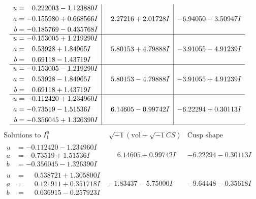 \documentclass[1p]{elsarticle_modified}
\theoremstyle{definition}
\newcommand{\I}{\sqrt{-1}}
\begin{document}
$$\begin{array}{c|c|c}
\begin{aligned}
u &= \phantom{-}0.222003 - 1.123880 I \\
a &= -0.155980 + 0.668566 I \\
b &= -0.185769 - 0.435768 I\end{aligned}
 & \phantom{-}2.27216 + 2.01728 I & -6.94050 - 3.50947 I \\ \hline\begin{aligned}
u &= -0.153005 + 1.219290 I \\
a &= \phantom{-}0.53928 + 1.84965 I \\
b &= \phantom{-}0.69118 - 1.43719 I\end{aligned}
 & \phantom{-}5.80153 + 4.79888 I & -3.91055 - 4.91239 I \\ \hline\begin{aligned}
u &= -0.153005 - 1.219290 I \\
a &= \phantom{-}0.53928 - 1.84965 I \\
b &= \phantom{-}0.69118 + 1.43719 I\end{aligned}
 & \phantom{-}5.80153 - 4.79888 I & -3.91055 + 4.91239 I \\ \hline\begin{aligned}
u &= -0.112420 + 1.234960 I \\
a &= -0.73519 - 1.51536 I \\
b &= -0.356045 + 1.326390 I\end{aligned}
 & \phantom{-}6.14605 - 0.99742 I & -6.22294 + 0.30113 I\\
 \hline 
 \end{array}$$\newpage$$\begin{array}{c|c|c}  
\text{Solutions to }I^u_{1}& \I (\text{vol} + \sqrt{-1}CS) & \text{Cusp shape}\\
 \hline 
\begin{aligned}
u &= -0.112420 - 1.234960 I \\
a &= -0.73519 + 1.51536 I \\
b &= -0.356045 - 1.326390 I\end{aligned}
 & \phantom{-}6.14605 + 0.99742 I & -6.22294 - 0.30113 I \\ \hline\begin{aligned}
u &= \phantom{-}0.538721 + 1.305800 I \\
a &= \phantom{-}0.121911 + 0.351718 I \\
b &= \phantom{-}0.036915 - 0.257923 I\end{aligned}
 & -1.83437 - 5.75000 I & -9.64448 - 0.35618 I \\ \hline\begin{aligned}

\end{aligned}
\end{array}$$
\end{document}
